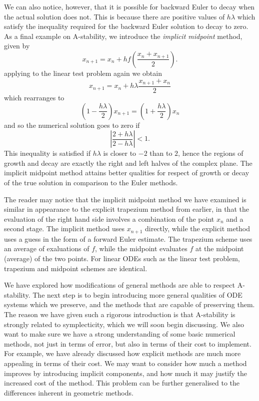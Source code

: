 We can also notice, however, that it is possible for backward Euler to decay when the actual solution does not.
This is because there are positive values of $h \lambda$ which satisfy the inequality required for the backward Euler solution to decay to zero.
As a final example on A-stability, we introduce the \textit{implicit midpoint} method, given by
\begin{equation}
    x_{n+1} = x_n + h f \left(
        \frac{x_n + x_{n+1}}{2}
    \right).
\end{equation} 
applying to the linear test problem again we obtain
\begin{equation*}
    x_{n+1} = x_n + h \lambda \frac{x_{n+1} + x_n}{2}
\end{equation*}
which rearranges to
\begin{equation*}
    \left( 1 - \frac{h \lambda}{2} \right) x_{n+1} = \left( 1 + \frac{h \lambda}{2} \right) x_n
\end{equation*}
and so the numerical solution goes to zero if
\begin{equation*}
    \left| \frac{2 + h \lambda}{2 - h \lambda} \right| < 1.
\end{equation*}
This inequality is satisfied if $h \lambda$ is closer to $-2$ than to $2$, hence the regions of growth and decay are exactly the right and left halves of the complex plane.
The implicit midpoint method attains better qualities for respect of growth or decay of the true solution in comparison to the Euler methods.

The reader may notice that the implicit midpoint method we have examined is similar in appearance to the explicit trapezium method from earlier,
in that the evaluation of the right hand side involves a combination of the point $x_n$ and a second stage.
The implicit method uses $x_{n+1}$ directly, while the explicit method uses a guess in the form of a forward Euler estimate.
The trapezium scheme uses an average of exaluations of $f$, while the midpoint evaluates $f$ at the midpoint (average) of the two points.
For linear ODEs such as the linear test problem, trapezium and midpoint schemes are identical.

We have explored how modifications of general methods are able to respect A-stability.
The next step is to begin introducing more general qualities of ODE systems which we preserve, and the methods that are capable of preserving them.
The reason we have given such a rigorous introduction is that A-stability is strongly related to symplecticity, which we will soon begin discussing.
We also want to make sure we have a strong understanding of some basic numerical methods, not just in terms of error, but also in terms of their cost to implement.
For example, we have already discussed how explicit methods are much more appealing in terms of their cost.
We may want to consider how much a method improves by introducing implicit components, and how much it may justify the increased cost of the method.
This problem can be further generalised to the differences inherent in geometric methods.

